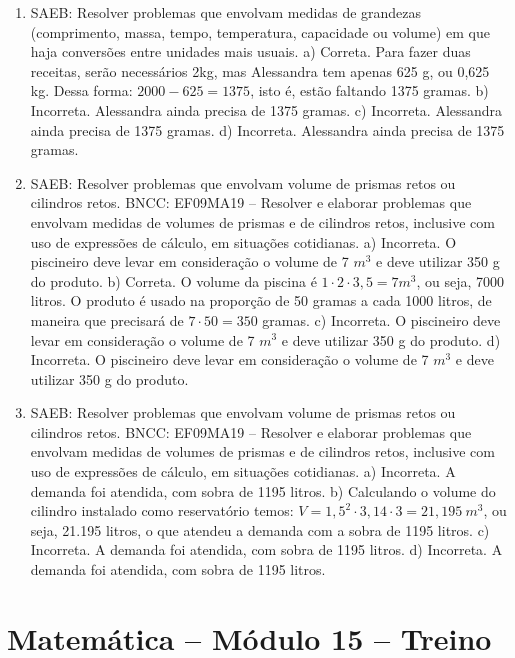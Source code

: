 \begin{enumerate}
\item
SAEB: Resolver problemas que envolvam medidas de grandezas (comprimento, massa, tempo, temperatura, capacidade ou volume) em que haja conversões entre unidades mais usuais.
a) Correta. Para fazer duas receitas, serão necessários 2kg, mas Alessandra tem apenas
625 g, ou 0,625 kg. Dessa forma: $2000 - 625 = 1375$, isto é, estão faltando 1375 gramas.
b) Incorreta. Alessandra ainda precisa de 1375 gramas.
c) Incorreta. Alessandra ainda precisa de 1375 gramas.
d) Incorreta. Alessandra ainda precisa de 1375 gramas.

\item
SAEB: Resolver problemas que envolvam volume de prismas retos ou cilindros retos.
BNCC: EF09MA19 -- Resolver e elaborar problemas que envolvam medidas de volumes de prismas e de cilindros retos, inclusive com uso de expressões de cálculo, em situações cotidianas.
a) Incorreta. O piscineiro deve levar em consideração o volume de 7 $m^3$ e deve utilizar 350 g do produto. 
b) Correta. O volume da piscina é $1 \cdot 2 \cdot 3,5 = 7 m^3$, ou seja, 7000 litros. O
produto é usado na proporção de 50 gramas a cada 1000 litros, de maneira que precisará de
$7 \cdot 50 = 350$ gramas.
c) Incorreta. O piscineiro deve levar em consideração o volume de 7 $m^3$ e deve utilizar 350 g do produto.
d) Incorreta. O piscineiro deve levar em consideração o volume de 7 $m^3$ e deve utilizar 350 g do produto.

\item
SAEB: Resolver problemas que envolvam volume de prismas retos ou cilindros retos.
BNCC: EF09MA19 -- Resolver e elaborar problemas que envolvam medidas de volumes de prismas e de cilindros retos, inclusive com uso de expressões de cálculo, em situações cotidianas.
a) Incorreta. A demanda foi atendida, com sobra de 1195 litros.
b) Calculando o volume do cilindro instalado como reservatório temos:
$V = {1,5}^{2} \cdot 3,14 \cdot 3 = 21,195\ m^3$, ou seja, 21.195
litros, o que atendeu a demanda com a sobra de 1195 litros. 
c) Incorreta. A demanda foi atendida, com sobra de 1195 litros.
d) Incorreta. A demanda foi atendida, com sobra de 1195 litros.
\end{enumerate}

\section*{Matemática – Módulo 15 – Treino}

